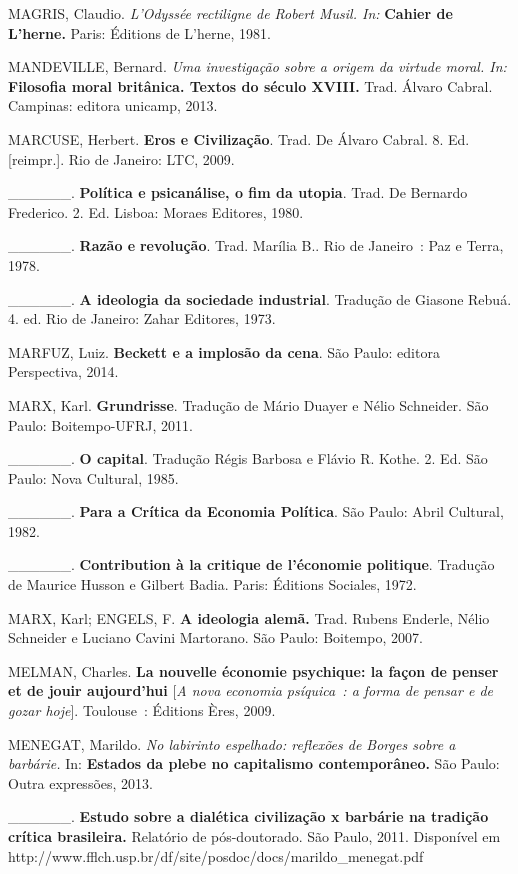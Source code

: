 MAGRIS, Claudio. \emph{L'Odyssée rectiligne de Robert Musil. In:}
\textbf{Cahier de L'herne.} Paris: Éditions de L'herne, 1981.

MANDEVILLE, Bernard. \emph{Uma investigação sobre a origem da virtude
moral. In:} \textbf{Filosofia moral britânica. Textos do século XVIII.}
Trad. Álvaro Cabral. Campinas: editora unicamp, 2013.

MARCUSE, Herbert. \textbf{Eros e Civilização}. Trad. De Álvaro Cabral.
8. Ed. {[}reimpr.{]}. Rio de Janeiro: LTC, 2009.

\_\_\_\_\_\_. \textbf{Política e psicanálise, o fim da utopia}. Trad. De
Bernardo Frederico. 2. Ed. Lisboa: Moraes Editores, 1980.

\_\_\_\_\_\_. \textbf{Razão e} \textbf{revolução}. Trad. Marília B.. Rio
de Janeiro~: Paz e Terra, 1978.

\_\_\_\_\_\_. \textbf{A ideologia da sociedade industrial}. Tradução de
Giasone Rebuá. 4. ed. Rio de Janeiro: Zahar Editores, 1973.

MARFUZ, Luiz. \textbf{Beckett e a implosão da cena}. São Paulo: editora
Perspectiva, 2014.

MARX, Karl. \textbf{Grundrisse}. Tradução de Mário Duayer e Nélio
Schneider. São Paulo: Boitempo-UFRJ, 2011.

\_\_\_\_\_\_. \textbf{O capital}. Tradução Régis Barbosa e Flávio R.
Kothe. 2. Ed. São Paulo: Nova Cultural, 1985.

\_\_\_\_\_\_. \textbf{Para a Crítica da Economia Política}. São Paulo:
Abril Cultural, 1982.

\_\_\_\_\_\_. \textbf{Contribution à la critique de l'économie
politique}. Tradução de Maurice Husson e Gilbert Badia. Paris: Éditions
Sociales, 1972.

MARX, Karl; ENGELS, F. \textbf{A ideologia alemã.} Trad. Rubens Enderle,
Nélio Schneider e Luciano Cavini Martorano. São Paulo: Boitempo, 2007.

MELMAN, Charles. \textbf{La nouvelle économie psychique: la façon de
penser et de jouir aujourd'hui} {[}\emph{A nova economia psíquica~: a
forma de pensar e de gozar hoje}{]}. Toulouse~: Éditions Ères, 2009.

MENEGAT, Marildo. \emph{No labirinto espelhado: reflexões de Borges
sobre a barbárie.} In: \textbf{Estados da plebe no capitalismo
contemporâneo.} São Paulo: Outra expressões, 2013.

\_\_\_\_\_\_. \textbf{Estudo sobre a dialética civilização x barbárie na
tradição crítica brasileira.} Relatório de pós-doutorado. São Paulo,
2011. Disponível em
http://www.fflch.usp.br/df/site/posdoc/docs/marildo\_menegat.pdf


